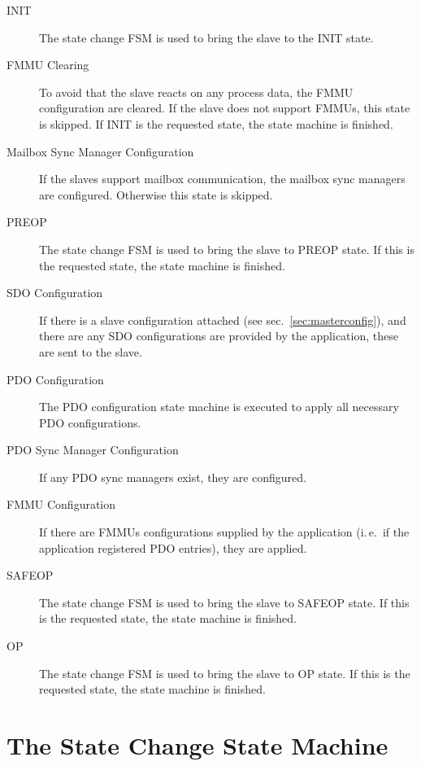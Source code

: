 \documentclass[a4paper,12pt,BCOR6mm,bibtotoc,idxtotoc]{scrbook}
\begin{document}
\begin{description}

\item[INIT] The state change FSM is used to bring the slave to the INIT state.

\item[FMMU Clearing] To avoid that the slave reacts on any process data, the
FMMU configuration are cleared. If the slave does not support FMMUs, this
state is skipped. If INIT is the requested state, the state machine is
finished.

\item[Mailbox Sync Manager Configuration] If the slaves support mailbox
communication, the mailbox sync managers are configured. Otherwise this state
is skipped.

\item[PREOP] The state change FSM is used to bring the slave to PREOP state.
If this is the requested state, the state machine is finished.

\item[SDO Configuration] If there is a slave configuration attached (see
sec.~\ref{sec:masterconfig}), and there are any SDO configurations are
provided by the application, these are sent to the slave.

\item[PDO Configuration] The PDO configuration state machine is executed to
apply all necessary PDO configurations.

\item[PDO Sync Manager Configuration] If any PDO sync managers exist, they are
configured.

\item[FMMU Configuration] If there are FMMUs configurations supplied by the
application (i.\,e.\ if the application registered PDO entries), they are
applied.

\item[SAFEOP] The state change FSM is used to bring the slave to SAFEOP state.
If this is the requested state, the state machine is finished.

\item[OP] The state change FSM is used to bring the slave to OP state.
If this is the requested state, the state machine is finished.

\end{description}


\section{The State Change State Machine}
\label{sec:fsm-change}
\end{document}
